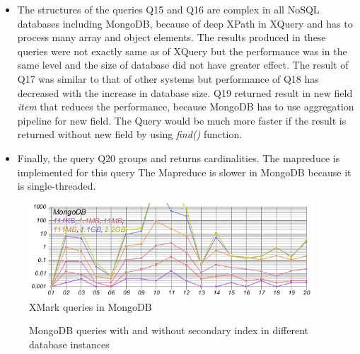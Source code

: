 \begin{itemize}
\item The structures of the queries Q15 and Q16 are complex in all NoSQL databases including MongoDB, because of deep XPath in XQuery and has to process many array and object elements. The results produced in these queries were not exactly same as of XQuery but the performance was in the same level and the size of database did not have greater effect. The result of Q17 was similar to that of other systems but performance of Q18 has decreased with the increase in database size. 
Q19 returned result in new field \textit{item} that reduces the performance, because  MongoDB has to use aggregation pipeline for new field.  The Query would be much more faster if the result is returned without new field by using \textit{find()} function.
\item Finally, the query Q20 groups and returns cardinalities. The mapreduce is implemented for this query The Mapreduce is slower in MongoDB because it is single-threaded.
\end{itemize}
\begin{figure}
	\centering
	\includegraphics[width=0.95\textwidth]{img/result/mongodb/mongodb-all}
	\caption{XMark queries in MongoDB}
	\label{fig:xmark-result-mongodb-all}
	
\end{figure}	
\begin{figure}
	\centering
	\centering
	\caption{MongoDB queries with and without secondary index in different database instances}
	\label{fig:xmark-mongodb-index-noindex}
\end{figure}

